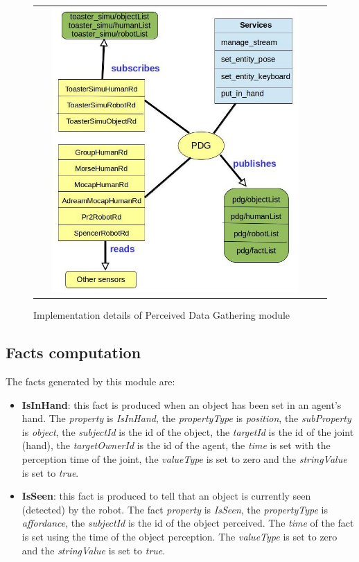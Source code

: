 \documentclass[a4paper]{article}
\begin{document}
 \begin{figure}[ht!]
 \centering
 \begin{tabular}{cc}
  \includegraphics[width=0.90\textwidth]{img/pdg.jpg}
 \end{tabular}
 \caption{Implementation details of Perceived Data Gathering module}
 \label{fig:pdg}
 \end{figure}
 
 
 \subsection{Facts computation}

The facts generated by this module are:

\begin{itemize}
\item \textbf{IsInHand}: this fact is produced when an object has been set in an agent's  hand. The \textit{property} is \textit{IsInHand}, the \textit{propertyType} is \textit{position}, the \textit{subProperty} is \textit{object}, the \textit{subjectId} is the id of the object, the \textit{targetId} is the id of the joint (hand), the \textit{targetOwnerId} is the id of the agent, the \textit{time} is set with the perception time of the joint, the \textit{valueType} is set to zero and the \textit{stringValue} is set to \textit{true}.
\item \textbf{IsSeen}: this fact is produced to tell that an object is currently seen (detected) by the robot. The fact \textit{property} is \textit{IsSeen}, the \textit{propertyType} is \textit{affordance}, the \textit{subjectId} is the id of the object perceived. The \textit{time} of the fact is set using the time of the object perception. The \textit{valueType} is set to zero and the \textit{stringValue} is set to \textit{true}. 

\end{itemize}
 
\end{document}
